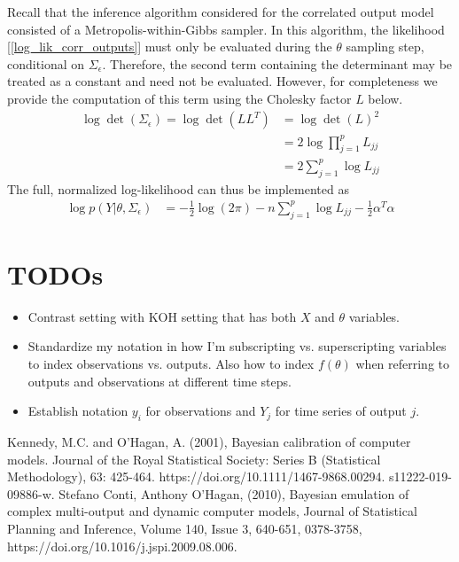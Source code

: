 \documentclass[12pt]{article}
\begin{document}
Recall that the inference algorithm considered for the correlated output model consisted of a Metropolis-within-Gibbs sampler. In this algorithm, the likelihood 
[\ref{log_lik_corr_outputs}] must only be evaluated during the $\theta$ sampling step, conditional on $\Sigma_\epsilon$. Therefore, the second term containing the 
determinant may be treated as a constant and need not be evaluated. However, for completeness we provide the computation of this term using the Cholesky 
factor $L$ below. 
\begin{align}
\log \det(\Sigma_\epsilon) = \log \det(LL^T) &= \log \det(L)^2 \\
								  &= 2 \log \prod_{j = 1}^{p} L_{jj} \\
								  &= 2 \sum_{j = 1}^{p} \log L_{jj}
\end{align}
The full, normalized log-likelihood can thus be implemented as
\begin{align}
\log p(Y|\theta, \Sigma_\epsilon) &= -\frac{1}{2} \log(2\pi) - n\sum_{j = 1}^{p} \log L_{jj}  - \frac{1}{2} \alpha^T \alpha
\end{align}


\section{TODOs}
\begin{itemize}
\item Contrast setting with KOH setting that has both $X$ and $\theta$ variables. 
\item Standardize my notation in how I'm subscripting vs. superscripting variables to index observations vs. outputs. Also how to 
index $f(\theta)$ when referring to outputs and observations at different time steps. 
\item Establish notation $y_i$ for observations and $Y_j$ for time series of output $j$. 
\end{itemize}

\begin{thebibliography}{20}
 Kennedy, M.C. and O'Hagan, A. (2001), Bayesian calibration of computer models. Journal of the Royal Statistical Society: Series B (Statistical Methodology), 63: 425-464. https://doi.org/10.1111/1467-9868.00294.
s11222-019-09886-w.
 Stefano Conti, Anthony O’Hagan, (2010), Bayesian emulation of complex multi-output and dynamic computer models, Journal of Statistical Planning and Inference,
Volume 140, Issue 3, 640-651, 0378-3758, https://doi.org/10.1016/j.jspi.2009.08.006.
\end{thebibliography}
\end{document}
